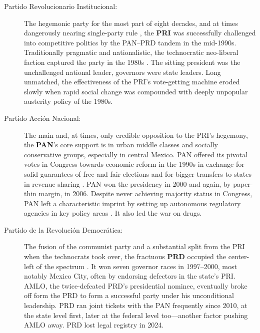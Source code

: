 \documentclass[letter,12pt]{article}
\begin{document}
\begin{description}

\item[Partido Revolucionario Institucional:] The hegemonic party for the most part of eight decades, and at times dangerously nearing single-party rule \citep{molinar.1991a}, the \textbf{PRI} was successfully challenged into competitive politics by the PAN--PRD tandem in the mid-1990s. Traditionally pragmatic and nationalistic, the technocratic neo-liberal faction captured the party in the 1980s \citep{dresser.Neolib1991}. The sitting president was the unchallenged national leader, governors were state leaders. Long unmatched, the effectiveness of the PRI's vote-getting machine eroded slowly when rapid social change was compounded with deeply unpopular austerity policy of the 1980s. 

\item[Partido Acción Nacional:] The main and, at times, only credible opposition to the PRI's hegemony, the \textbf{PAN}'s core support is in urban middle classes and socially conservative groups, especially in central Mexico. PAN offered its pivotal votes in Congress towards economic reform in the 1990s in exchange for solid guarantees of free and fair elections \citep{cornelius.1996} and for bigger transfers to states in revenue sharing \citep{diaz.cayeros.2006, shirk.PANbook.2005}. PAN won the presidency in 2000 and again, by paper-thin margin, in 2006. Despite never achieving majority status in Congress, PAN left a characteristic imprint by setting up autonomous regulatory agencies in key policy areas \citep[telecomms, energy, education, antitrust, freedom of information, and more; see][]{magar.estevez.rosas.2010}. It also led the war on drugs.

\item[Partido de la Revolución Democrática:] The fusion of the communist party and a substantial split from the PRI when the technocrats took over, the fractuous \textbf{PRD} occupied the center-left of the spectrum \citep{bruhn.1997, cantuCSG2019apsr}. It won seven governor races in 1997--2000, most notably Mexico City, often by endorsing defectors in the state's PRI. AMLO, the twice-defeated PRD's presidential nominee, eventually broke off form the PRD to form a successful party under his unconditional leadership. PRD ran joint tickets with the PAN frequently since 2010, at the state level first, later at the federal level too---another factor pushing AMLO away. PRD lost legal registry in 2024.
  

\end{description}
\end{document}
